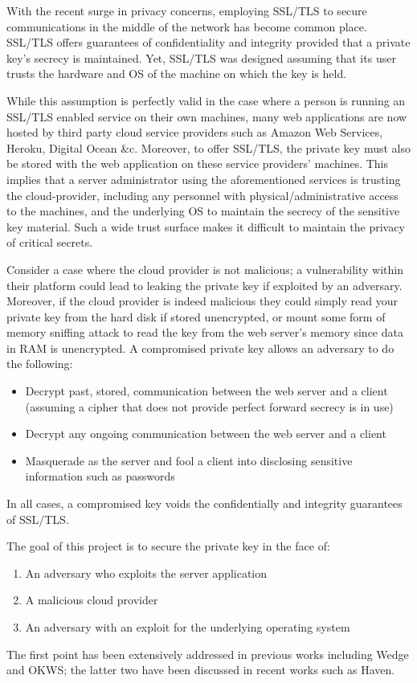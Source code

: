 \documentclass[../main.tex]{subfiles}
\begin{document}
With the recent surge in privacy concerns, employing SSL/TLS to secure communications in the middle of the network has become common place. 
SSL/TLS offers guarantees of confidentiality and integrity provided that a private key's secrecy is maintained. Yet, SSL/TLS was designed 
assuming that its user trusts the hardware and OS of the machine on which the key is held. 

While this assumption is perfectly valid in the case where a person is running an SSL/TLS enabled service on their own machines, many web
applications are now hosted by third party cloud service providers such as Amazon Web Services, Heroku, Digital Ocean \&c. Moreover, to offer 
SSL/TLS, the private key must also be stored with the web application on these service providers' machines. This implies that a server administrator 
using the aforementioned services is trusting the cloud-provider, including any personnel with physical/administrative access to the machines, and the underlying OS
to maintain the secrecy of the sensitive key material. Such a wide trust surface makes it difficult to maintain the privacy of critical
secrets.

Consider a case where the cloud provider is not malicious; a vulnerability within their platform could lead to leaking the private key
if exploited by an adversary. Moreover, if the cloud provider is indeed malicious they could simply read your private key from the hard disk if stored 
unencrypted, or mount some form of memory sniffing attack to read the key from the web server's memory since data in RAM is unencrypted. A compromised private 
key allows an adversary to do the following:
\begin{itemize}
	\item Decrypt past, stored, communication between the web server and a client (assuming a cipher that does not provide perfect forward secrecy is in use)
	\item Decrypt any ongoing communication between the web server and a client
	\item Masquerade as the server and fool a client into disclosing sensitive information such as passwords
\end{itemize}
In all cases, a compromised key voids the confidentially and integrity guarantees of SSL/TLS. 

The goal of this project is to secure the private key in the face of:
\begin{enumerate}
	\item An adversary who exploits the server application 
	\item A malicious cloud provider 
	\item An adversary with an exploit for the underlying operating system
\end{enumerate} 
The first point has been extensively addressed in previous works including Wedge and OKWS; %
the latter two have been discussed in recent works such as Haven. 						   %
\end{document}
